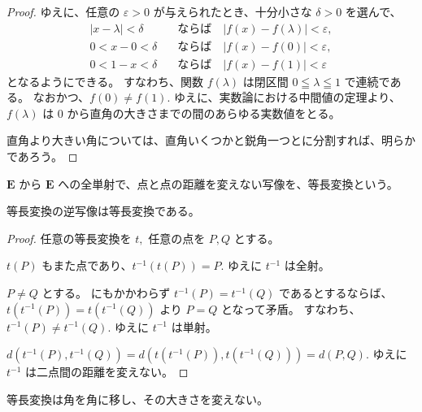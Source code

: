 \begin{proof}
  ゆえに、任意の \(\varepsilon>0\) が与えられたとき、十分小さな \(\delta>0\) を選んで、
  \begin{align*}
    |x-\lambda|<\delta \quad & \text{ならば} \quad |f(x)-f(\lambda)|<\varepsilon, \\
          0<x-0<\delta \quad & \text{ならば} \quad |f(x)-f(0)|<\varepsilon, \\
          0<1-x<\delta \quad & \text{ならば} \quad |f(x)-f(1)|<\varepsilon
  \end{align*}
  となるようにできる。
  すなわち、関数 \(f(\lambda)\) は閉区間 \(0\leqq\lambda\leqq1\) で連続である。
  なおかつ、\(f(0)\neq f(1).\)
  ゆえに、実数論における中間値の定理より、\(f(\lambda)\) は \(0\) から直角の大きさまでの間のあらゆる実数値をとる。

  直角より大きい角については、直角いくつかと鋭角一つとに分割すれば、明らかであろう。
\end{proof}

\begin{dfn}
  \(\bm{E}\) から \(\bm{E}\) への全単射で、点と点の距離を変えない写像を、等長変換という。
\end{dfn}

\begin{lmm}\label{251227090701}
 等長変換の逆写像は等長変換である。
\end{lmm}

\begin{proof}
  任意の等長変換を \(t,\) 任意の点を \(P,Q\) とする。

  \(t(P)\) もまた点であり、\(t^{-1}(t(P))=P.\)
  ゆえに \(t^{-1}\) は全射。

  \(P\neq Q\) とする。
  にもかかわらず \(t^{-1}(P)=t^{-1}(Q)\) であるとするならば、\(t(t^{-1}(P))=t(t^{-1}(Q))\) より \(P=Q\) となって矛盾。
  すなわち、\(t^{-1}(P)\neq t^{-1}(Q).\)
  ゆえに \(t^{-1}\) は単射。

  \(d(t^{-1}(P),t^{-1}(Q))=d(t(t^{-1}(P)),t(t^{-1}(Q)))=d(P,Q).\)
  ゆえに \(t^{-1}\) は二点間の距離を変えない。
\end{proof}

\begin{thm}
 等長変換は角を角に移し、その大きさを変えない。
\end{thm}

